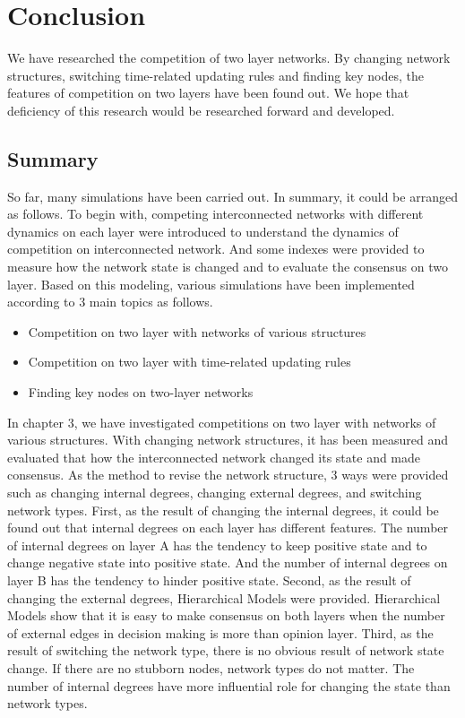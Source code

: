 
\chapter{Conclusion}
\label{chap:conclusion}
We have researched the competition of two layer networks. By changing network structures, switching time-related updating rules and finding key nodes, the features of competition on two layers have been found out. We hope that deficiency of this research would be researched forward and developed. 
\section{Summary}
So far, many simulations have been carried out. In summary, it could be arranged as follows. 
To begin with, competing interconnected networks with different dynamics on each layer were introduced to understand the dynamics of competition on interconnected network.  And some indexes were provided to measure how the network state is changed and to evaluate the consensus on two layer. Based on this modeling, various simulations have been implemented according to 3 main topics as follows.
\begin{itemize}
\item Competition on two layer with networks of various structures
\item Competition on two layer with time-related updating rules
\item Finding key nodes on two-layer networks
\end{itemize}
In chapter 3, we have investigated competitions on two layer with networks of various structures. With changing network structures, it has been measured and evaluated that how the interconnected network changed its state and made consensus. As the method to revise the network structure, 3 ways were provided such as changing internal degrees, changing external degrees, and switching network types. 
First, as the result of changing the internal degrees, it could be found out that internal degrees on each layer has different features. The number of internal degrees on layer A has the tendency to keep positive state and to change negative state into positive state. And the number of internal degrees on layer B has the tendency to hinder positive state. Second, as the result of changing the external degrees, Hierarchical Models were provided. Hierarchical Models show that it is easy to make consensus on both layers when the number of external edges in decision making is more than opinion layer. Third, as the result of switching the network type, there is no obvious result of network state change. If there are no stubborn nodes, network types do not matter. The number of internal degrees have more influential role for changing the state than network types.\\

